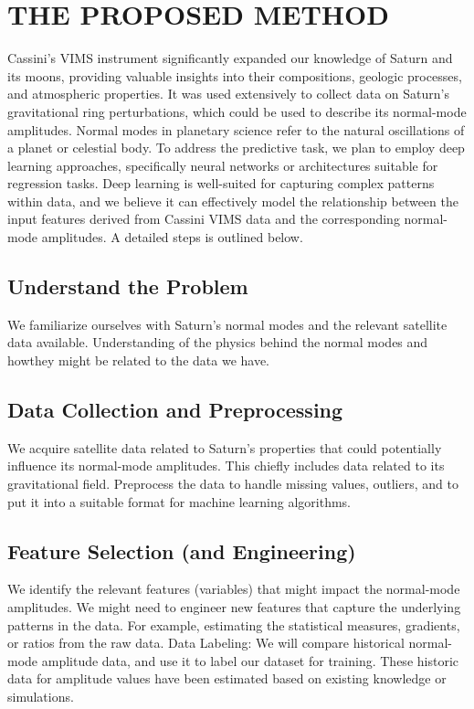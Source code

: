 \documentclass[conference]{IEEEtran}
\begin{document}
\section{THE PROPOSED METHOD}
Cassini's VIMS instrument significantly expanded our knowledge of Saturn and its moons, providing valuable
insights into their compositions, geologic processes, and atmospheric properties. It was used extensively to
collect data on Saturn's gravitational ring perturbations, which could be used to describe its normal-mode
amplitudes. Normal modes in planetary science refer to the natural oscillations of a planet or celestial body. To
address the predictive task, we plan to employ deep learning approaches, specifically neural networks or
architectures suitable for regression tasks. Deep learning is well-suited for capturing complex patterns within
data, and we believe it can effectively model the relationship between the input features derived from Cassini
VIMS data and the corresponding normal-mode amplitudes. A detailed steps is outlined below.

\subsection{Understand the Problem}
We familiarize ourselves with Saturn's normal modes and the relevant satellite data
available. Understanding of the physics behind the normal modes and howthey might be related to the data we
have.
\subsection{Data Collection and Preprocessing}
We acquire satellite data related to Saturn's properties that could
potentially influence its normal-mode amplitudes. This chiefly includes data related to its gravitational field.
Preprocess the data to handle missing values, outliers, and to put it into a suitable format for machine learning
algorithms.
\subsection{Feature Selection (and Engineering)}
We identify the relevant features (variables) that might impact the
normal-mode amplitudes. We might need to engineer new features that capture the underlying patterns in the
data. For example, estimating the statistical measures, gradients, or ratios from the raw data.
Data Labeling: We will compare historical normal-mode amplitude data, and use it to label our dataset for
training. These historic data for amplitude values have been estimated based on existing knowledge or
simulations.
\end{document}
